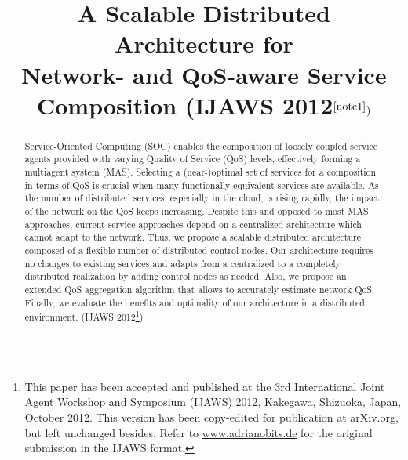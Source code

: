 \documentclass[10pt, conference, compsocconf]{IEEEtran}
\begin{document}
\title{	A Scalable Distributed Architecture for\\Network- and QoS-aware Service Composition {\normalsize (IJAWS 2012$^{\ref{note1}})$} }

\author{
\and
\and
}

\maketitle 

\setcounter{footnote}{0} 

\begin{abstract} Service-Oriented Computing (SOC) enables the composition of loosely coupled service agents
	provided with varying Quality of Service (QoS) levels,
		effectively forming a multiagent system (MAS).
Selecting a (near-)optimal set of services for a composition in terms of QoS is crucial
	when many functionally equivalent services are available.
As the number of distributed services, especially in the cloud, is rising rapidly,
	the impact of the network on the QoS keeps increasing.
Despite this and opposed to most MAS approaches, current service approaches depend on a centralized architecture which cannot adapt to the network.
Thus, we propose a scalable distributed architecture composed of a flexible number of distributed control nodes.
Our architecture requires no changes to existing services and 
	adapts from a centralized to a completely distributed realization	by adding control nodes as needed.
Also, we propose an extended QoS aggregation algorithm that allows to accurately estimate network QoS.
Finally, we evaluate the benefits and optimality of our architecture in a distributed environment.
{\small (IJAWS 2012\footnote{\label{note1}This paper has been accepted and published at the 3rd International Joint Agent Workshop and Symposium (IJAWS) 2012, Kakegawa, Shizuoka, Japan, October 2012.
This version has been copy-edited for publication at arXiv.org, but left unchanged besides.
Refer to \url{www.adrianobits.de} for the original submission in the IJAWS format.})}
\end{abstract}
\end{document}
